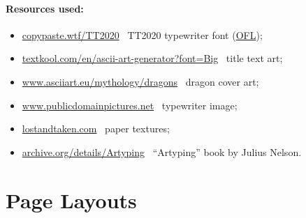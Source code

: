 \documentclass[english,12pt,openany,letterpaper]{book}
\begin{document}
\paragraph{Resources used:}
\begin{itemize}
	\item \href{https://copypaste.wtf/TT2020/}{copypaste.wtf/TT2020} \dash\ TT2020 typewriter font (\href{https://openfontlicense.org/}{OFL});
	\item \href{https://textkool.com/en/ascii-art-generator?font=Big&text=Retrotype}{textkool.com/en/ascii-art-generator?font=Big} \dash\ title text art;
	\item \href{https://www.asciiart.eu/mythology/dragons}{www.asciiart.eu/mythology/dragons} \dash\ dragon cover art;
	\item \href{https://www.publicdomainpictures.net/en/view-image.php?image=166303}{www.publicdomainpictures.net} \dash\ typewriter image;
	\item \href{https://lostandtaken.com/}{lostandtaken.com} \dash\ paper textures;
	\item \href{https://archive.org/details/Artyping}{archive.org/details/Artyping} \dash\  ``Artyping'' book by Julius Nelson.
\end{itemize}

\break


\section{Page Layouts}
\end{document}
